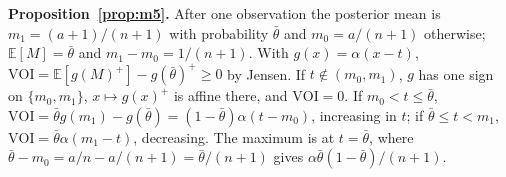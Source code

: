 \documentclass[11pt]{article}
\theoremstyle{definition}
\begin{document}
\textbf{Proposition~\ref{prop:m5}.} After one observation the posterior mean is $m_1=(a+1)/(n+1)$
with probability $\bar\theta$ and $m_0=a/(n+1)$ otherwise; $\mathbb E[M]=\bar\theta$ and
$m_1-m_0=1/(n+1)$. With $g(x)=\alpha(x-t)$, $\mathrm{VOI}=\mathbb E[g(M)^+]-g(\bar\theta)^+\ge0$ by
Jensen. If $t\notin(m_0,m_1)$, $g$ has one sign on $\{m_0,m_1\}$, $x\mapsto g(x)^+$ is affine there,
and $\mathrm{VOI}=0$. If $m_0<t\le\bar\theta$, $\mathrm{VOI}=\bar\theta g(m_1)-g(\bar\theta)=
(1-\bar\theta)\alpha(t-m_0)$, increasing in $t$; if $\bar\theta\le t<m_1$,
$\mathrm{VOI}=\bar\theta\alpha(m_1-t)$, decreasing. The maximum is at $t=\bar\theta$, where
$\bar\theta-m_0=a/n-a/(n+1)=\bar\theta/(n+1)$ gives $\alpha\bar\theta(1-\bar\theta)/(n+1)$.

\end{document}
